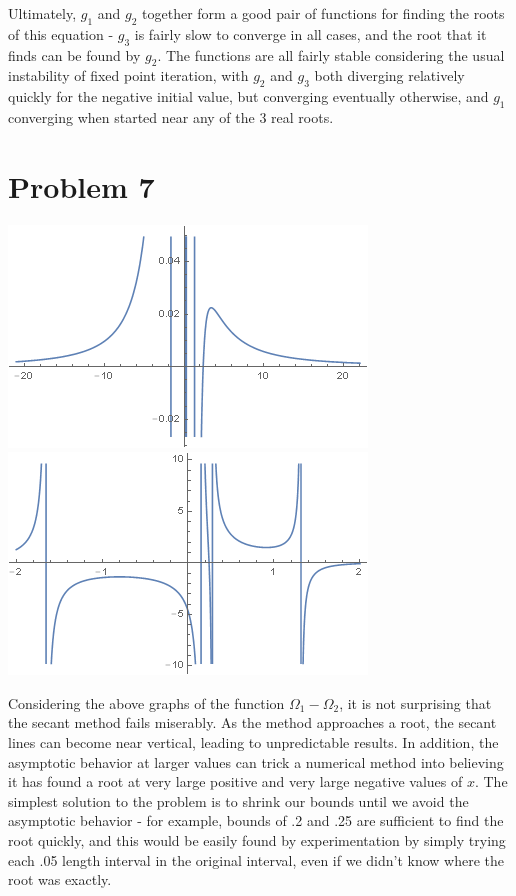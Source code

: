 \documentclass[11pt]{article} %
\begin{document}
\par Ultimately, $g_1$ and $g_2$ together form a good pair of functions for finding the roots of this equation - $g_3$ is fairly slow to converge in all cases, and the root that it finds can be found by $g_2$. The functions are all fairly stable considering the usual instability of fixed point iteration, with $g_2$ and $g_3$ both diverging relatively quickly for the negative initial value, but converging eventually otherwise, and $g_1$ converging when started near any of the 3 real roots.
\section*{Problem 7}
\includegraphics[scale=.5]{problem7plota.png}
\includegraphics[scale=.5]{problem7plotb.png}
\par Considering the above graphs of the function $\Omega_1 - \Omega_2$, it is not surprising that the secant method fails
miserably. As the method approaches a root, the secant lines can become near vertical, leading to unpredictable results. In addition, the asymptotic behavior at larger values can trick a numerical method into believing it has found a root at very large positive and very large negative values of $x$.
	The simplest solution to the problem is to shrink our bounds until we avoid the asymptotic behavior - for example, bounds of .2 and .25 are sufficient to find the root quickly, and this would be easily found by experimentation by simply trying each .05 length interval in the original interval, even if we didn't  know where the root was exactly.
\end{document}
